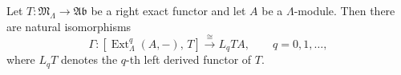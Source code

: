 \begin{corollary}\label{cor:10.2}
Let $T \colon \mathfrak{M}_\Lambda \to \mathfrak{Ab}$ be a right exact functor and let $A$ be a $\Lambda$-module. Then there are natural isomorphisms
$$
\Gamma \colon [\operatorname{Ext}_\Lambda^q(A, -),\, T] \xrightarrow{\cong} L_q TA, \qquad q = 0, 1, \dots,
$$
where $L_q T$ denotes the $q$-th left derived functor of $T$.
\end{corollary}
